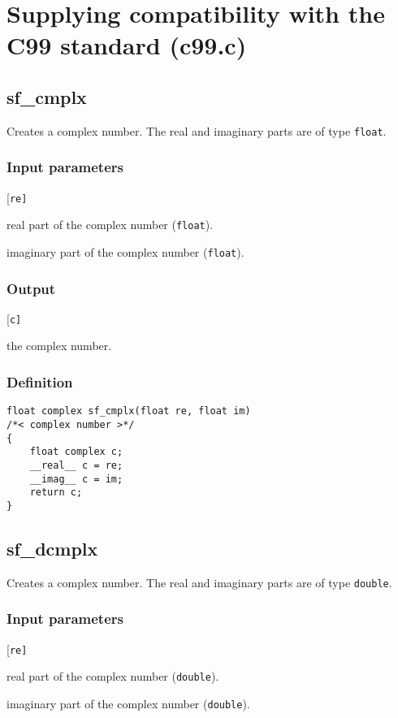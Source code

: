 \section{Supplying compatibility with the C99 standard (c99.c)}




\subsection{{sf\_cmplx}}
Creates a complex number. The real and imaginary parts are of type \texttt{float}.

\subsubsection*{Input parameters}
\begin{desclist}{\tt }{\quad}[\tt re]
   \setlength\itemsep{0pt}
   \item[re] real part of the complex number (\texttt{float}).
   \item[im] imaginary part of the complex number (\texttt{float}).
\end{desclist}

\subsubsection*{Output}
\begin{desclist}{\tt }{\quad}[\tt c]
   \setlength\itemsep{0pt}
   \item[c] the complex number.
\end{desclist}

\subsubsection*{Definition}
\begin{verbatim}
float complex sf_cmplx(float re, float im)
/*< complex number >*/
{
    float complex c;
    __real__ c = re;
    __imag__ c = im;
    return c;
}
\end{verbatim}




\subsection{{sf\_dcmplx}}
Creates a complex number. The real and imaginary parts are of type \texttt{double}.

\subsubsection*{Input parameters}
\begin{desclist}{\tt }{\quad}[\tt re]
   \setlength\itemsep{0pt}
   \item[re] real part of the complex number (\texttt{double}).
   \item[im] imaginary part of the complex number (\texttt{double}).
\end{desclist}

